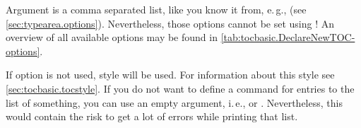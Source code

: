 Argument  is a comma separated list, like you know it from,
e.\,g.,  (see
\autoref{sec:typearea.options}). Nevertheless, those
options cannot be set using ! An
overview of all available options may be found in
\autoref{tab:tocbasic.DeclareNewTOC-options}.

If option 
is not used, style  will be used. For information about this
style see \autoref{sec:tocbasic.tocstyle}. If you do not want to define a
command for entries to the list of something, you can use an empty argument,
i.\,e.,  or
. Nevertheless, this would contain
the risk to get a lot of errors while printing that list.

